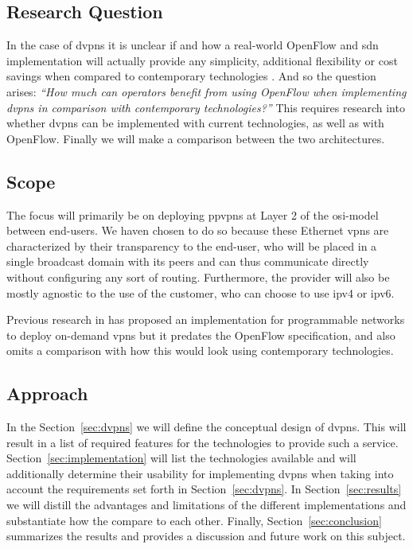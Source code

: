 	\subsection{Research Question} %
	\label{sub:research_question}
	In the case of \acp{dvpn} it is unclear if and how a real-world OpenFlow and \ac{sdn} implementation will actually provide any simplicity, additional flexibility or cost savings when compared to contemporary technologies \cite{programmability-answer}. And so the question arises: \textsl{``How much can operators benefit from using OpenFlow when implementing \aclp{dvpn} in comparison with contemporary technologies?''} 
	This requires research into whether \acp{dvpn} can be implemented with current technologies, as well as with OpenFlow. Finally we will make a comparison between the two architectures.


	\subsection{Scope} %
	\label{sub:scope}
	The focus will primarily be on deploying \acp{ppvpn} at Layer 2 of the \acs{osi}-model between end-users. We haven chosen to do so because these Ethernet \acp{vpn} are characterized by their transparency to the end-user, who will be placed in a single broadcast domain with its peers and can thus communicate directly without configuring any sort of routing. Furthermore, the provider will also be mostly agnostic to the use of the customer, who can choose to use \acs{ip}v4 or \acs{ip}v6.
	
	Previous research in \cite{net-prog-vpn} has proposed an implementation for programmable networks to deploy on-demand \acp{vpn} but it predates the OpenFlow specification, and also omits a comparison with how this would look using contemporary technologies. 


	\subsection{Approach} %
	\label{sub:approach}
	In the Section~\ref{sec:dvpns} we will define the conceptual design of \acp{dvpn}. This will result in a list of required features for the technologies to provide such a service. Section~\ref{sec:implementation} will list the technologies available and will additionally determine their usability for implementing \acp{dvpn} when taking into account the requirements set forth in Section~\ref{sec:dvpns}. In Section~\ref{sec:results} we will distill the advantages and limitations of the different implementations and substantiate how the compare to each other. Finally, Section~\ref{sec:conclusion} summarizes the results and provides a discussion and future work on this subject.


